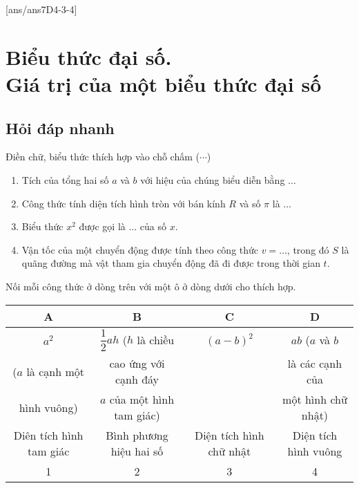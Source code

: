 [ans/ans7D4-3-4]
\section{Biểu thức đại số.\\ Giá trị của một biểu thức đại số}
\subsection{Hỏi đáp nhanh}
\begin{ex}%
	Điền chữ, biểu thức thích hợp vào chỗ chấm ($\cdots$)
	\begin{enumerate}
		\item Tích của tổng hai số $a$ và $b$ với hiệu của chúng biểu diễn bằng $\ldots$
		\item Công thức tính diện tích hình tròn với bán kính $R$ và số $\pi$ là $\ldots$
		\item Biểu thức $x^2$ được gọi là $\ldots$ của số $x$.
		\item Vận tốc của một chuyển động được tính theo công thức $v=\ldots$, trong đó $S$ là quãng đường mà vật tham gia chuyển động đã đi được trong thời gian $t$.
	\end{enumerate}
\end{ex}
\begin{ex}%
	Nối mỗi công thức ở dòng trên với một ô ở dòng dưới cho thích hợp.
	\begin{center}
		\begin{tabular}{|c|c|c|c|}
			\hline 
			A	&B  &C  &D  \\ 
			\hline 
			$a^2$ 	& $\dfrac{1}{2}ah$ ($h$ là chiều   & $(a-b)^2$ & $ab$ ($a$ và $b$\\ 
			($a$ là cạnh một	&cao ứng với cạnh đáy&&là các cạnh của\\
			hình vuông)	&$a$ của một hình tam giác)&&  một hình chữ nhật) \\
			\hline 
			Diên tích hình tam giác&Bình phương hiệu hai số  &  Diện tích hình chữ nhật&Diện tích hình vuông  \\ 
			\hline 
			1	&2  &3  &4  \\ 
			\hline 
		\end{tabular} 	
	\end{center}
\end{ex}
